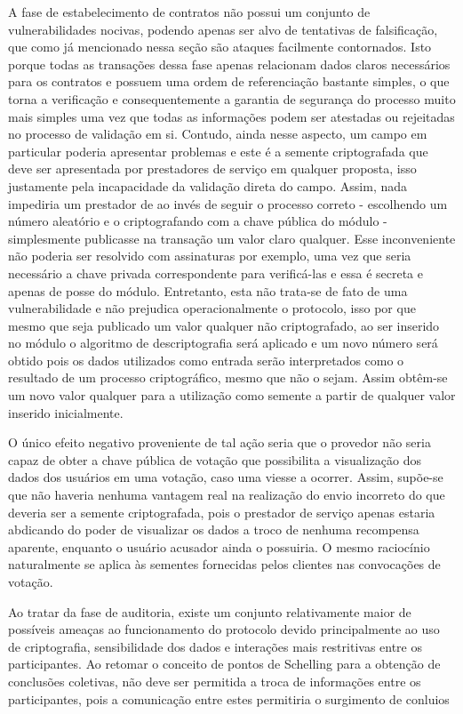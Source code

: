 A fase de estabelecimento de contratos não possui um conjunto de vulnerabilidades nocivas, podendo apenas ser alvo de tentativas de falsificação, que como já mencionado nessa seção são ataques facilmente contornados. Isto porque todas as transações dessa fase apenas relacionam dados claros necessários para os contratos e possuem uma ordem de referenciação bastante simples, o que torna a verificação e consequentemente a garantia de segurança do processo muito mais simples uma vez que todas as informações podem ser atestadas ou rejeitadas no processo de validação em si. Contudo, ainda nesse aspecto, um campo em particular poderia apresentar problemas e este é a semente criptografada que deve ser apresentada por prestadores de serviço em qualquer proposta, isso justamente pela incapacidade da validação direta do campo. Assim, nada impediria um prestador de ao invés de seguir o processo correto - escolhendo um número aleatório e o criptografando com a chave pública do módulo - simplesmente publicasse na transação um valor claro qualquer. Esse inconveniente não poderia ser resolvido com assinaturas por exemplo, uma vez que seria necessário a chave privada correspondente para verificá-las e essa é secreta e apenas de posse do módulo. Entretanto, esta não trata-se de fato de uma vulnerabilidade e não prejudica operacionalmente o protocolo, isso por que mesmo que seja publicado um valor qualquer não criptografado, ao ser inserido no módulo o algoritmo de descriptografia será aplicado e um novo número será obtido pois os dados utilizados como entrada serão interpretados como o resultado de um processo criptográfico, mesmo que não o sejam. Assim obtêm-se um novo valor qualquer para a utilização como semente a partir de qualquer valor inserido inicialmente.

O único efeito negativo proveniente de tal ação seria que o provedor não seria capaz de obter a chave pública de votação que possibilita a visualização dos dados dos usuários em uma votação, caso uma viesse a ocorrer. Assim, supõe-se que não haveria nenhuma vantagem real na realização do envio incorreto do que deveria ser a semente criptografada, pois o prestador de serviço apenas estaria abdicando do poder de visualizar os dados a troco de nenhuma recompensa aparente, enquanto o usuário acusador ainda o possuiria. O mesmo raciocínio naturalmente se aplica às sementes fornecidas pelos clientes nas convocações de votação.

Ao tratar da fase de auditoria, existe um conjunto relativamente maior de possíveis ameaças ao funcionamento do protocolo devido principalmente ao uso de criptografia, sensibilidade dos dados e interações mais restritivas entre os participantes. Ao retomar o conceito de pontos de Schelling para a obtenção de conclusões coletivas, não deve ser permitida a troca de informações entre os participantes, pois a comunicação entre estes permitiria o surgimento de conluios

